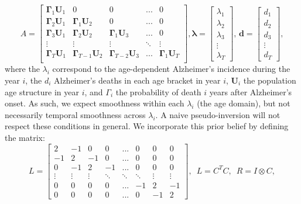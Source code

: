 \documentclass{article}
\def\blambda{\boldsymbol{\lambda}}
\def\bd{\boldsymbol{d}}
\begin{document}
\begin{equation}
    A=\begin{bmatrix}
    \boldsymbol{\Gamma}_1 \boldsymbol{U}_1 & 0 & 0 & ... & 0 \\ 
    \boldsymbol{\Gamma}_2 \boldsymbol{U}_1 & \boldsymbol{\Gamma}_1 \boldsymbol{U}_2 & 0 & ... & 0 \\     
    \boldsymbol{\Gamma}_3 \boldsymbol{U}_1 & \boldsymbol{\Gamma}_2 \boldsymbol{U}_2 & \boldsymbol{\Gamma}_1 \boldsymbol{U}_3 & ... & 0 \\     
    \vdots & \vdots & \vdots & \ddots & \vdots \\
    \boldsymbol{\Gamma}_T \boldsymbol{U}_1 & \boldsymbol{\Gamma}_{T-1} \boldsymbol{U}_2 & \boldsymbol{\Gamma}_{T-2} \boldsymbol{U}_3 & ... & \boldsymbol{\Gamma}_{1} \boldsymbol{U}_T \\     
    \end{bmatrix} ,   \blambda = \begin{bmatrix} \lambda_{1} \\ \lambda_2 \\ \lambda_3 \\ \vdots \\ \lambda_T \end{bmatrix}, \, \bd = \begin{bmatrix} d_{1} \\ d_2 \\ d_3 \\ \vdots \\ d_T \end{bmatrix},  \end{equation}
where the $\lambda_i$ correspond to the age-dependent Alzheimer's incidence during the year $i$, the $d_i$ Alzheimer's deaths in each age bracket in year $i$, $\boldsymbol{U}_i$ the population age structure in year $i$, and $\Gamma_i$ the probability of death $i$ years after Alzheimer's onset. As such, we expect smoothness within each $\lambda_i$ (the age domain), but not necessarily temporal smoothness across $\lambda_i$. A naive pseudo-inversion will not respect these conditions in general. We incorporate this prior belief by defining the matrix:
\begin{equation}
    L=\begin{bmatrix}
        2 & -1 & 0 & 0 & ... & 0 & 0 & 0 \\
        -1 & 2 & -1 & 0 & ... & 0 & 0 & 0 \\ 
        0 & -1 & 2 & -1 & ... & 0 & 0 & 0 \\
        \vdots&   \vdots & \vdots & \ddots & \ddots & \ddots & \vdots & \vdots \\        
        0 & 0 & 0 & 0 & ... & -1 & 2 & -1 \\
        0 & 0 & 0 & 0 & ... & 0 & -1 & 2
    \end{bmatrix}, \,\,\, L = C^T C, \,\,\, R = I \otimes C,
    \end{equation}
\end{document}
